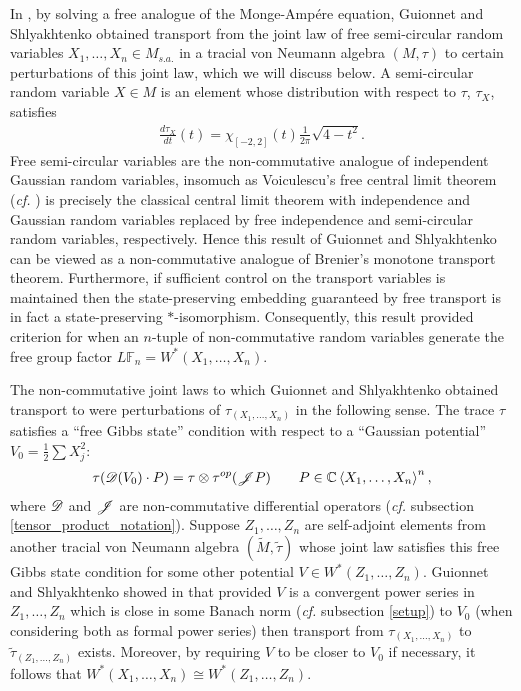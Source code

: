 In \cite{GS14}, by solving a free analogue of the Monge-Amp\'{e}re equation, Guionnet and Shlyakhtenko obtained transport from the joint law of free semi-circular random variables $X_1,\ldots, X_n \in M_{s.a.}$ in a tracial von Neumann algebra $(M,\tau)$ to certain perturbations of this joint law, which we will discuss below. A semi-circular random variable $X\in M$ is an element whose distribution with respect to $\tau$, $\tau_X$, satisfies
	\begin{align*}
		\frac{d\tau_X}{d t}(t) = \chi_{[-2,2]}(t) \frac{1}{2\pi} \sqrt{4 - t^2}.
	\end{align*}
Free semi-circular variables are the non-commutative analogue of independent Gaussian random variables, insomuch as Voiculescu's free central limit theorem (\emph{cf.} \cite{Voi91}) is precisely the classical central limit theorem with independence and Gaussian random variables replaced by free independence and semi-circular random variables, respectively. Hence this result of Guionnet and Shlyakhtenko can be viewed as a non-commutative analogue of Brenier's monotone transport theorem. Furthermore, if sufficient control on the transport variables is maintained then the state-preserving embedding guaranteed by free transport is in fact a state-preserving $*$-isomorphism. Consequently, this result provided criterion for when an $n$-tuple of non-commutative random variables generate the free group factor $L \mathbb{F}_n = W^*(X_1,\ldots, X_n)$.

The non-commutative joint laws to which Guionnet and Shlyakhtenko obtained transport to were perturbations of $\tau_{(X_1,\ldots, X_n)}$ in the following sense. The trace $\tau$ satisfies a ``free Gibbs state'' condition with respect to a ``Gaussian potential'' $V_0=\frac{1}{2}\sum X_j^2$:
	\begin{align*}
		\tau( \mathscr{D}(V_0) \cdot P) = \tau\otimes\tau^{op}(\mathscr{J} P)\qquad P\in \mathbb{C}\left\langle X_1,\ldots, X_n\right\rangle^n,
	\end{align*}
where $\mathscr{D}$ and $\mathscr{J}$ are non-commutative differential operators (\emph{cf.} subsection \ref{tensor_product_notation}). Suppose $Z_1,\ldots, Z_n$ are self-adjoint elements from another tracial von Neumann algebra $(\tilde{M}, \tilde{\tau})$ whose joint law satisfies this free Gibbs state condition for some other potential $V\in W^*(Z_1,\ldots, Z_n)$. Guionnet and Shlyakhtenko showed in \cite{GS14} that provided $V$ is a convergent power series in $Z_1,\ldots, Z_n$ which is close in some Banach norm (\emph{cf.} subsection \ref{setup}) to $V_0$ (when considering both as formal power series) then transport from $\tau_{(X_1,\ldots, X_n)}$ to $\tilde{\tau}_{(Z_1,\ldots, Z_n)}$ exists. Moreover, by requiring $V$ to be closer to $V_0$ if necessary, it follows that $W^*(X_1,\ldots, X_n)\cong W^*(Z_1,\ldots, Z_n)$.
 
